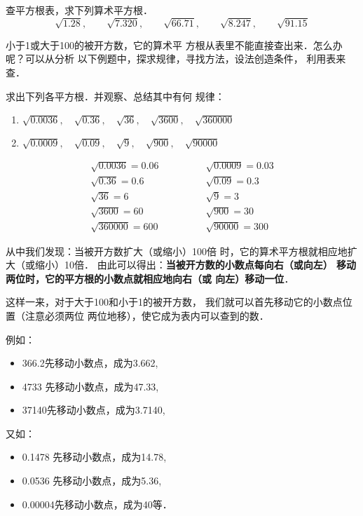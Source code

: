 \begin{ex}
    查平方根表，求下列算术平方根．
\[\sqrt{1.28},\qquad \sqrt{7.320},\qquad \sqrt{66.71},\qquad \sqrt{8.247},\qquad \sqrt{91.15} \]
\end{ex}

小于1或大于100的被开方数，它的算术平
方根从表里不能直接查出来．怎么办呢？可以从分析
以下例题中，探求规律，寻找方法，设法创造条件，
利用表来查．


\begin{example}
    求出下列各平方根．并观察、总结其中有何
规律：
\begin{enumerate}
    \item $\sqrt{0.0036},\quad \sqrt{0.36},\quad \sqrt{36},\quad \sqrt{3600},\quad \sqrt{360000}$
    \item $\sqrt{0.0009},\quad \sqrt{0.09},\quad \sqrt{9},\quad \sqrt{900},\quad \sqrt{90000} $
\end{enumerate}
\end{example}

\begin{solution}
\[\begin{array}{ll}
    \sqrt{0.0036}=0.06\qquad \qquad  &  \sqrt{0.0009}=0.03 \\
     \sqrt{0.36}=0.6 &  \sqrt{0.09}=0.3\\
      \sqrt{36}=6 & \sqrt{9}=3 \\
      \sqrt{3600}=60 &  \sqrt{900}=30 \\
       \sqrt{360000}=600 &  \sqrt{90000} =300
\end{array}\]
\end{solution}

从中我们发现：当被开方数扩大（或缩小）100倍
时，它的算术平方根就相应地扩大（或缩小）10倍．
由此可以得出：\textbf{当被开方数的小数点每向右（或向左）
移动两位时，它的平方根的小数点就相应地向右（或
向左）移动一位}．

这样一来，对于大于100和小于1的被开方数，
我们就可以首先移动它的小数点位置（注意必须两位
两位地移），使它成为表内可以查到的数．

例如：
\begin{itemize}
    \item 366.2先移动小数点，成为3.662,
    \item 4733 先移动小数点，成为47.33,
    \item 37140先移动小数点，成为3.7140,
\end{itemize}

又如：
\begin{itemize}
    \item 0.1478 先移动小数点，成为14.78,
    \item 0.0536 先移动小数点，成为5.36,
    \item 0.00004先移动小数点，成为40等．
\end{itemize}

